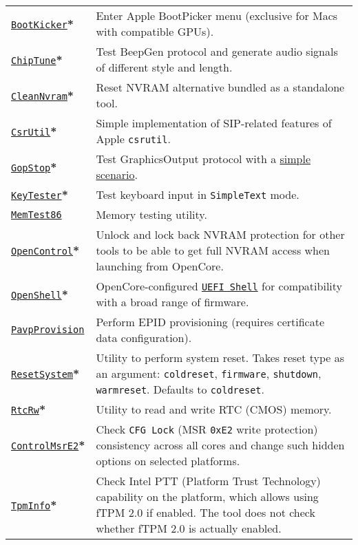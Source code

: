 \documentclass[]{article}
\begin{document}
\begin{tabular}{p{1.3in}p{5.55in}}
\href{https://github.com/acidanthera/OpenCorePkg}{\texttt{BootKicker}}\textbf{*}
& Enter Apple BootPicker menu (exclusive for Macs with compatible GPUs). \\
\href{https://github.com/acidanthera/OpenCorePkg}{\texttt{ChipTune}}\textbf{*}
& Test BeepGen protocol and generate audio signals of different style and length. \\
\href{https://github.com/acidanthera/OpenCorePkg}{\texttt{CleanNvram}}\textbf{*}
& Reset NVRAM alternative bundled as a standalone tool. \\
\href{https://github.com/acidanthera/OpenCorePkg}{\texttt{CsrUtil}}\textbf{*}
& Simple implementation of SIP-related features of Apple \texttt{csrutil}. \\
\href{https://github.com/acidanthera/OpenCorePkg}{\texttt{GopStop}}\textbf{*}
& Test GraphicsOutput protocol with a
  \href{https://github.com/acidanthera/OpenCorePkg/tree/master/Application/GopStop}{simple scenario}. \\
\href{https://github.com/acidanthera/OpenCorePkg}{\texttt{KeyTester}}\textbf{*}
& Test keyboard input in \texttt{SimpleText} mode. \\
\href{https://www.memtest86.com}{\texttt{MemTest86}}
& Memory testing utility. \\
\href{https://github.com/acidanthera/OpenCorePkg}{\texttt{OpenControl}}\textbf{*}
& Unlock and lock back NVRAM protection for other tools to be able to get full NVRAM access
  when launching from OpenCore. \\
\href{https://github.com/acidanthera/OpenCorePkg}{\texttt{OpenShell}}\textbf{*}
& OpenCore-configured \href{http://github.com/tianocore/edk2}{\texttt{UEFI Shell}} for compatibility
  with a broad range of firmware. \\
\href{https://github.com/acidanthera/OpenCorePkg}{\texttt{PavpProvision}}
& Perform EPID provisioning (requires certificate data configuration). \\
\href{https://github.com/acidanthera/OpenCorePkg}{\texttt{ResetSystem}}\textbf{*}
& Utility to perform system reset. Takes reset type as an argument:
  \texttt{coldreset}, \texttt{firmware}, \texttt{shutdown}, \texttt{warmreset}.
  Defaults to \texttt{coldreset}. \\
\href{https://github.com/acidanthera/OpenCorePkg}{\texttt{RtcRw}}\textbf{*}
& Utility to read and write RTC (CMOS) memory. \\
\href{https://github.com/acidanthera/OpenCorePkg}{\texttt{ControlMsrE2}}\textbf{*}
& Check \texttt{CFG Lock} (MSR \texttt{0xE2} write protection) consistency
across all cores and change such hidden options on selected platforms. \\
\href{https://github.com/acidanthera/OpenCorePkg}{\texttt{TpmInfo}}\textbf{*}
& Check Intel PTT (Platform Trust Technology) capability on the platform,
which allows using fTPM 2.0 if enabled. The tool does not check whether fTPM 2.0
is actually enabled.
\end{tabular}
\end{document}
